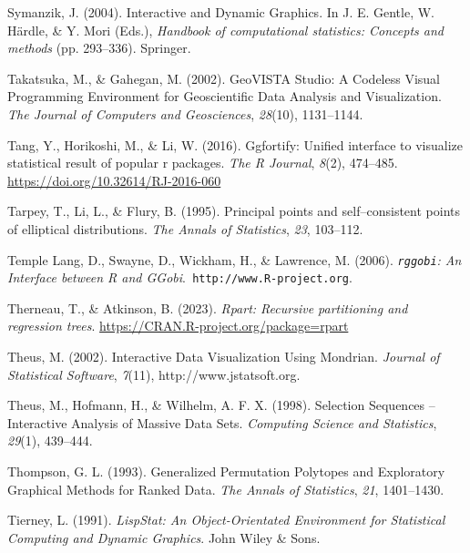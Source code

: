 \documentclass[
  letterpaper,
]{krantz}
\newlength{\cslhangindent}
\newenvironment{CSLReferences}[2] %
 {\begin{list}{}{%
  \setlength{\itemindent}{0pt}
  \setlength{\leftmargin}{0pt}
  \setlength{\parsep}{0pt}
  \ifodd #1
   \setlength{\leftmargin}{\cslhangindent}
   \setlength{\itemindent}{-1\cslhangindent}
  \fi
  \setlength{\itemsep}{#2\baselineskip}}}
 {\end{list}}
\begin{document}
\begin{CSLReferences}{1}{0}
Symanzik, J. (2004). Interactive and {D}ynamic {G}raphics. In J. E.
Gentle, W. Härdle, \& Y. Mori (Eds.), \emph{Handbook of computational
statistics: Concepts and methods} (pp. 293--336). Springer.

Takatsuka, M., \& Gahegan, M. (2002). {GeoVISTA Studio}: A {C}odeless
{V}isual {P}rogramming {E}nvironment for {G}eoscientific {D}ata
{A}nalysis and {V}isualization. \emph{The Journal of Computers and
Geosciences}, \emph{28}(10), 1131--1144.

Tang, Y., Horikoshi, M., \& Li, W. (2016). Ggfortify: Unified interface
to visualize statistical result of popular r packages. \emph{The R
Journal}, \emph{8}(2), 474--485.
\url{https://doi.org/10.32614/RJ-2016-060}

Tarpey, T., Li, L., \& Flury, B. (1995). Principal points and
self--consistent points of elliptical distributions. \emph{The Annals of
Statistics}, \emph{23}, 103--112.

Temple Lang, D., Swayne, D., Wickham, H., \& Lawrence, M. (2006).
\emph{{\texttt{rggobi}}: {A}n {I}nterface between {R} and
{GG}obi}.{\texttt{\ http://www.R-project.org}}.

Therneau, T., \& Atkinson, B. (2023). \emph{Rpart: Recursive
partitioning and regression trees}.
\url{https://CRAN.R-project.org/package=rpart}

Theus, M. (2002). Interactive {D}ata {V}isualization {U}sing {M}ondrian.
\emph{Journal of Statistical Software}, \emph{7}(11),
http://www.jstatsoft.org.

Theus, M., Hofmann, H., \& Wilhelm, A. F. X. (1998). Selection
{S}equences -- {I}nteractive {A}nalysis of {M}assive {D}ata {S}ets.
\emph{Computing Science and Statistics}, \emph{29}(1), 439--444.

Thompson, G. L. (1993). Generalized {P}ermutation {P}olytopes and
{E}xploratory {G}raphical {M}ethods for {R}anked {D}ata. \emph{The
Annals of Statistics}, \emph{21}, 1401--1430.

Tierney, L. (1991). \emph{{L}isp{S}tat: {A}n {O}bject-{O}rientated
{E}nvironment for {S}tatistical {C}omputing and {D}ynamic {G}raphics}.
John Wiley \& Sons.


\end{CSLReferences}
\end{document}
